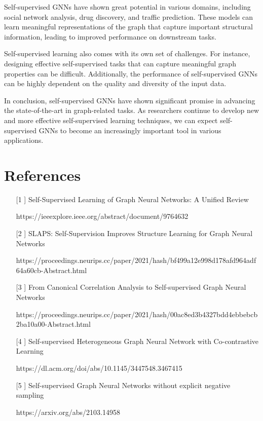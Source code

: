 \documentclass[a4paper,11pt]{report}
\begin{document}
Self-supervised GNNs have shown great potential in various domains, including social network analysis, drug discovery, and traffic prediction. These models can learn meaningful representations of the graph that capture important structural information, leading to improved performance on downstream tasks.

Self-supervised learning also comes with its own set of challenges. For instance, designing effective self-supervised tasks that can capture meaningful graph properties can be difficult. Additionally, the performance of self-supervised GNNs can be highly dependent on the quality and diversity of the input data.

In conclusion, self-supervised GNNs have shown significant promise in advancing the state-of-the-art in graph-related tasks. As researchers continue to develop new and more effective self-supervised learning techniques, we can expect self-supervised GNNs to become an increasingly important tool in various applications.

\chapter{References}

\begin{itemize}
\item[[1]] Self-Supervised Learning of Graph Neural Networks: A Unified Review

https://ieeexplore.ieee.org/abstract/document/9764632

\item[[2]] SLAPS: Self-Supervision Improves Structure Learning for Graph Neural Networks

https://proceedings.neurips.cc/paper/2021/hash/bf499a12e998d178afd964adf64a60cb-Abstract.html

\item[[3]] From Canonical Correlation Analysis to Self-supervised Graph Neural Networks

https://proceedings.neurips.cc/paper/2021/hash/00ac8ed3b4327bdd4ebbebcb2ba10a00-Abstract.html

\item[[4]] Self-supervised Heterogeneous Graph Neural Network with Co-contrastive Learning

https://dl.acm.org/doi/abs/10.1145/3447548.3467415

\item[[5]] Self-supervised Graph Neural Networks without explicit negative sampling

https://arxiv.org/abs/2103.14958

\vspace{12pt}
\end{itemize}
\end{document}
